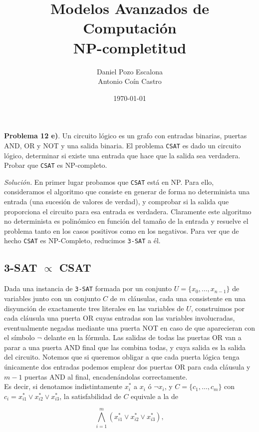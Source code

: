\documentclass[11pt,a4paper]{article}
\title{Modelos Avanzados de Computación \\ \Large{NP-completitud}}
\author{Daniel Pozo Escalona \\ Antonio Coín Castro}
\date{\today}
\newenvironment{sol}{\begin{adjustwidth}{1em}{}}{\end{adjustwidth}}
\begin{document}
\maketitle

\textbf{Problema 12 e)}. Un circuito lógico es un grafo con entradas binarias, puertas AND, OR y NOT y una salida binaria. El problema \verb|CSAT| es dado un circuito lógico, determinar si existe una entrada
que hace que la salida sea verdadera. Probar que \verb|CSAT| es NP-completo.\\

\begin{sol} \textit{Solución.} En primer lugar probamos que \verb|CSAT| está en NP. Para ello, consideramos el algoritmo que consiste en generar de forma no determinista una entrada (una sucesión de valores de verdad), y comprobar si la salida que proporciona el circuito para esa entrada es verdadera. Claramente este algoritmo no determinista es polinómico en función del tamaño de la entrada y resuelve el problema tanto en los casos positivos como en los negativos. Para ver que de hecho \verb|CSAT| es NP-Completo, reducimos \verb|3-SAT| a él.

\subsection*{3-SAT $\mathbf{\propto}$ CSAT}

Dada una instancia de \verb|3-SAT| formada por un conjunto $U=\{x_0, \dots, x_{n-1}\}$ de variables junto con un conjunto $C$ de $m$ cláusulas, cada una consistente en una disyunción de exactamente tres literales en las variables de $U$, construimos por cada cláusula una puerta OR cuyas entradas son las variables involucradas, eventualmente negadas mediante una puerta NOT en caso de que aparecieran con el símbolo $\lnot$ delante en la fórmula. Las salidas de todas las puertas OR van a parar a una puerta AND final que las combina todas, y cuya salida es la salida del circuito. Notemos que si queremos obligar a que cada puerta lógica tenga únicamente dos entradas podemos emplear dos puertas OR para cada cláusula y $m-1$ puertas AND al final, encadenándolas correctamente.\\

Es decir, si denotamos indistintamente $x^*_i$ a $x_i$ ó $\lnot x_i$, y $C = \{ c_1, \dots, c_m\}$ con $c_i = x^*_{i1} \lor x^*_{i2}\lor x^*_{i3}$, la satisfabilidad de $C$ equivale a la de

\[
\bigwedge_{i=1}^m (x^*_{i1} \lor x^*_{i2} \lor x^*_{i3}),
\]


\end{sol}
\end{document}
